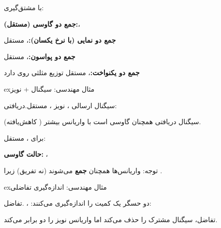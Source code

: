 \PSbr{}

با مشتق‌گیری: 


\textbf{جمع دو گاوسی (مستقل):}\PSbr{}، 

\textbf{جمع دو نمایی (با نرخ یکسان):}\PSbr{}،  مستقل 

\textbf{جمع دو پواسون:}\PSbr{}،  مستقل 

\textbf{جمع دو یکنواخت:}\PSbr{}،  مستقل  توزیع مثلثی روی \lr{\mbox{[0,2]}} دارد

\begin{PSbox}[unbreakable]{ex}{مثال مهندسی: سیگنال + نویز}

سیگنال ارسالی ، نویز ، مستقل.\PSbr{}دریافتی: 

سیگنال دریافتی همچنان گاوسی است  با واریانس بیشتر ( کاهش‌یافته).

\end{PSbox}


برای ،  مستقل:

\textbf{حالت گاوسی:} ، 

توجه: واریانس‌ها همچنان \textbf{جمع} می‌شوند (نه تفریق) زیرا .

\begin{PSbox}[unbreakable]{ex}{مثال مهندسی: اندازه‌گیری تفاضلی}

دو حسگر یک کمیت را اندازه‌گیری می‌کنند: ، .\PSbr{}تفاضل: 

تفاضل، سیگنال مشترک را حذف می‌کند اما واریانس نویز را دو برابر می‌کند.

\end{PSbox}

